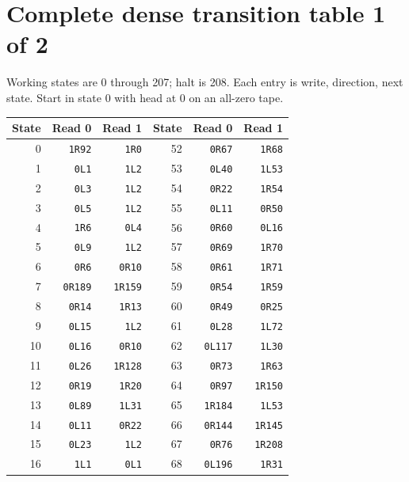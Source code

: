 \clearpage
\section*{Complete dense transition table 1 of 2}
\noindent Working states are 0 through 207; halt is 208. Each entry is write, direction, next state. Start in state 0 with head at 0 on an all-zero tape.\par\medskip
\begin{center}\fontsize{9}{10}\selectfont\setlength{\tabcolsep}{11pt}
\begin{tabular}{rrr@{\hspace{22pt}}rrr}\toprule
State & Read 0 & Read 1 & State & Read 0 & Read 1\\\midrule
0 & \texttt{1R92} & \texttt{1R0} & 52 & \texttt{0R67} & \texttt{1R68} \\
1 & \texttt{0L1} & \texttt{1L2} & 53 & \texttt{0L40} & \texttt{1L53} \\
2 & \texttt{0L3} & \texttt{1L2} & 54 & \texttt{0R22} & \texttt{1R54} \\
3 & \texttt{0L5} & \texttt{1L2} & 55 & \texttt{0L11} & \texttt{0R50} \\
4 & \texttt{1R6} & \texttt{0L4} & 56 & \texttt{0R60} & \texttt{0L16} \\
5 & \texttt{0L9} & \texttt{1L2} & 57 & \texttt{0R69} & \texttt{1R70} \\
6 & \texttt{0R6} & \texttt{0R10} & 58 & \texttt{0R61} & \texttt{1R71} \\
7 & \texttt{0R189} & \texttt{1R159} & 59 & \texttt{0R54} & \texttt{1R59} \\
8 & \texttt{0R14} & \texttt{1R13} & 60 & \texttt{0R49} & \texttt{0R25} \\
9 & \texttt{0L15} & \texttt{1L2} & 61 & \texttt{0L28} & \texttt{1L72} \\
10 & \texttt{0L16} & \texttt{0R10} & 62 & \texttt{0L117} & \texttt{1L30} \\
11 & \texttt{0L26} & \texttt{1R128} & 63 & \texttt{0R73} & \texttt{1R63} \\
12 & \texttt{0R19} & \texttt{1R20} & 64 & \texttt{0R97} & \texttt{1R150} \\
13 & \texttt{0L89} & \texttt{1L31} & 65 & \texttt{1R184} & \texttt{1L53} \\
14 & \texttt{0L11} & \texttt{0R22} & 66 & \texttt{0R144} & \texttt{1R145} \\
15 & \texttt{0L23} & \texttt{1L2} & 67 & \texttt{0R76} & \texttt{1R208} \\
16 & \texttt{1L1} & \texttt{0L1} & 68 & \texttt{0L196} & \texttt{1R31} \\

\end{tabular}
\end{center}
